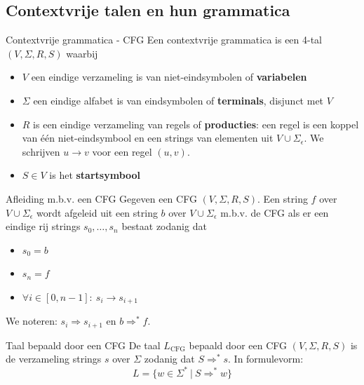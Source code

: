 \subsection{Contextvrije talen en hun grammatica}

\vspace{0.5cm}

\begin{theo}{Contextvrije grammatica - CFG}
    Een contextvrije grammatica is een 4-tal $(V, \Sigma, R, S)$ waarbij
    \begin{itemize}
        \item $V$ een eindige verzameling is van niet-eindsymbolen of \textbf{variabelen}
        \item $\Sigma$ een eindige alfabet is van eindsymbolen of \textbf{terminals}, disjunct met $V$
        \item $R$ is een eindige verzameling van regels of \textbf{producties}: een regel is een koppel van één niet-eindsymbool en een strings van elementen uit $V \cup \Sigma_{\epsilon}$. 
              We schrijven $u \to v$ voor een regel $(u,v)$.
        \item $S \in V$ is het \textbf{startsymbool}
    \end{itemize}
    \vspace{-0.3cm}
\end{theo}

\begin{theo}{Afleiding m.b.v. een CFG}
    Gegeven een CFG $(V, \Sigma, R, S)$. Een string $f$ over $V \cup \Sigma_{\epsilon}$ wordt afgeleid uit een string $b$ over $V \cup \Sigma_{\epsilon}$ 
    m$.$b$.$v$.$ de CFG als er een eindige rij strings $s_0, \ldots, s_n$ bestaat zodanig dat
    \begin{itemize}
        \item $s_0 = b$
        \item $s_n = f$
        \item $\forall i \in [0,n-1]: \ s_i \to s_{i+1}$
    \end{itemize} 
    We noteren: $s_i \Rightarrow s_{i+1}$ en $b \Rightarrow^* f$. 
    \vspace{-0.1cm}
\end{theo}

\begin{theo}{Taal bepaald door een CFG}
    De taal $L_{\text{CFG}}$ bepaald door een CFG $(V, \Sigma, R, S)$ is de verzameling strings $s$ over $\Sigma$ zodanig dat $S \Rightarrow^* s$. In formulevorm:
    \begin{equation*}
        L = \{ w \in \Sigma^* \ | \ S \Rightarrow^* w \}
    \end{equation*}
    \vspace{-0.5cm}
\end{theo}

